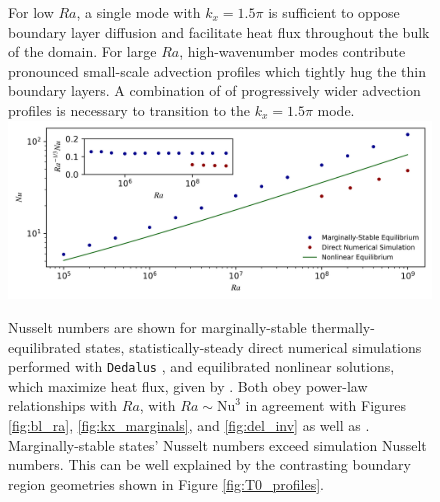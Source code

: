 \documentclass[reprint,amsmath,amssymb,aps]{revtex4-1}
\newcommand\Nu{\mathrm{Nu}}
\begin{document}
\begin{figure}
{    For low $Ra$, a single mode with $k_x = 1.5\pi$ is sufficient to oppose boundary layer diffusion and facilitate heat flux throughout the bulk of the domain. 
    For large $Ra$, high-wavenumber modes contribute pronounced small-scale advection profiles which tightly hug the thin boundary layers. 
    A combination of of progressively wider advection profiles is necessary to transition to the $k_x = 1.5\pi$ mode.}
    \label{fig:flux}
    \vspace{0.4in}
    \includegraphics[width=7.1in]{nu_ra.PNG}
    \caption{Nusselt numbers are shown for marginally-stable thermally-equilibrated states, statistically-steady direct numerical simulations performed with \texttt{Dedalus} \cite{Anders_cd}, and equilibrated nonlinear solutions, which maximize heat flux, given by \cite{Waleffe}. 
    Both obey power-law relationships with $Ra$, with $Ra \sim \Nu^3$ in agreement with Figures \ref{fig:bl_ra}, \ref{fig:kx_marginals}, and \ref{fig:del_inv} as well as \cite{Malkus}. 
    Marginally-stable states' Nusselt numbers exceed simulation Nusselt numbers. 
    This can be well explained by the contrasting boundary region geometries shown in Figure \ref{fig:T0_profiles}.}%
    \label{fig:nu_vs_ra}%
\end{figure}
\end{document}
